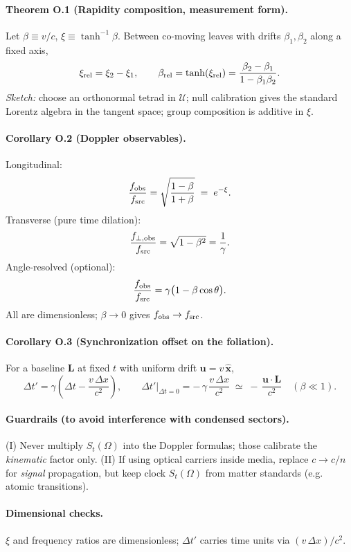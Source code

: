 \documentclass[11pt]{article}
\begin{document}
		\paragraph{Theorem O.1 (Rapidity composition, measurement form).}
		Let $\beta \equiv v/c$, $\xi \equiv \tanh^{-1}\!\beta$. Between co-moving leaves with drifts $\beta_1,\beta_2$ along a fixed axis,
		\[
			\xi_{\rm rel}=\xi_2-\xi_1,
			\qquad
			\beta_{\rm rel}=\tanh(\xi_{\rm rel})=\frac{\beta_2-\beta_1}{1-\beta_1\beta_2}.
		\]
		\emph{Sketch:} choose an orthonormal tetrad in $\mathcal U$; null calibration gives the standard Lorentz algebra in the tangent space; group composition is additive in $\xi$.

		\paragraph{Corollary O.2 (Doppler observables).}
		Longitudinal:
		\[
			\frac{f_{\rm obs}}{f_{\rm src}}=\sqrt{\frac{1-\beta}{1+\beta}} \;=\; e^{-\xi}.
		\]
		Transverse (pure time dilation):
		\[
			\frac{f_{\perp,{\rm obs}}}{f_{\rm src}}=\sqrt{1-\beta^2}=\frac{1}{\gamma}.
		\]
		Angle-resolved (optional):
		\[
			\frac{f_{\rm obs}}{f_{\rm src}}=\gamma\bigl(1-\beta\cos\theta\bigr).
		\]
		All are dimensionless; $\beta\to 0$ gives $f_{\rm obs}\to f_{\rm src}$.

		\paragraph{Corollary O.3 (Synchronization offset on the foliation).}
		For a baseline $\mathbf L$ at fixed $t$ with uniform drift $\mathbf u = v\,\hat{\mathbf x}$,
		\[
			\Delta t'=\gamma\!\left(\Delta t-\frac{v\,\Delta x}{c^2}\right),
			\qquad
			\Delta t'\big|_{\Delta t=0}=-\,\gamma\,\frac{v\,\Delta x}{c^2}
			\;\simeq\; -\,\frac{\mathbf u\!\cdot\!\mathbf L}{c^2}\quad (\beta\ll 1).
		\]

		\paragraph{Guardrails (to avoid interference with condensed sectors).}
		(I) Never multiply $S_t(\Omega)$ into the Doppler formulas; those calibrate the \emph{kinematic} factor only.
		(II) If using optical carriers inside media, replace $c\!\to\! c/n$ for \emph{signal} propagation, but keep clock $S_t(\Omega)$ from matter standards (e.g. atomic transitions).

		\paragraph{Dimensional checks.}
		$\xi$ and frequency ratios are dimensionless; $\Delta t'$ carries time units via $(v\,\Delta x)/c^2$.

\fi


		\nocite{*}
    
    
\end{document}
